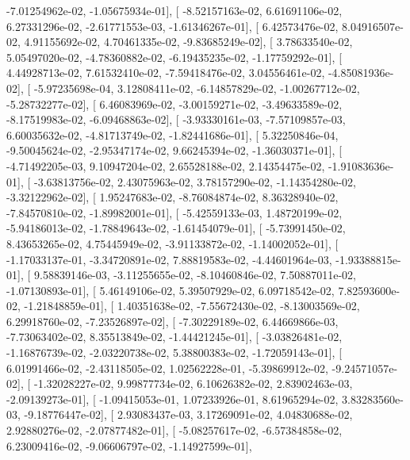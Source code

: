 \documentclass{article}
\begin{document}
         -7.01254962e-02,  -1.05675934e-01],
       [ -8.52157163e-02,   6.61691106e-02,   6.27331296e-02,
         -2.61771553e-03,  -1.61346267e-01],
       [  6.42573476e-02,   8.04916507e-02,   4.91155692e-02,
          4.70461335e-02,  -9.83685249e-02],
       [  3.78633540e-02,   5.05497020e-02,  -4.78360882e-02,
         -6.19435235e-02,  -1.17759292e-01],
       [  4.44928713e-02,   7.61532410e-02,  -7.59418476e-02,
          3.04556461e-02,  -4.85081936e-02],
       [ -5.97235698e-04,   3.12808411e-02,  -6.14857829e-02,
         -1.00267712e-02,  -5.28732277e-02],
       [  6.46083969e-02,  -3.00159271e-02,  -3.49633589e-02,
         -8.17519983e-02,  -6.09468863e-02],
       [ -3.93330161e-03,  -7.57109857e-03,   6.60035632e-02,
         -4.81713749e-02,  -1.82441686e-01],
       [  5.32250846e-04,  -9.50045624e-02,  -2.95347174e-02,
          9.66245394e-02,  -1.36030371e-01],
       [ -4.71492205e-03,   9.10947204e-02,   2.65528188e-02,
          2.14354475e-02,  -1.91083636e-01],
       [ -3.63813756e-02,   2.43075963e-02,   3.78157290e-02,
         -1.14354280e-02,  -3.32122962e-02],
       [  1.95247683e-02,  -8.76084874e-02,   8.36328940e-02,
         -7.84570810e-02,  -1.89982001e-01],
       [ -5.42559133e-03,   1.48720199e-02,  -5.94186013e-02,
         -1.78849643e-02,  -1.61454079e-01],
       [ -5.73991450e-02,   8.43653265e-02,   4.75445949e-02,
         -3.91133872e-02,  -1.14002052e-01],
       [ -1.17033137e-01,  -3.34720891e-02,   7.88819583e-02,
         -4.44601964e-03,  -1.93388815e-01],
       [  9.58839146e-03,  -3.11255655e-02,  -8.10460846e-02,
          7.50887011e-02,  -1.07130893e-01],
       [  5.46149106e-02,   5.39507929e-02,   6.09718542e-02,
          7.82593600e-02,  -1.21848859e-01],
       [  1.40351638e-02,  -7.55672430e-02,  -8.13003569e-02,
          6.29918760e-02,  -7.23526897e-02],
       [ -7.30229189e-02,   6.44669866e-03,  -7.73063402e-02,
          8.35513849e-02,  -1.44421245e-01],
       [ -3.03826481e-02,  -1.16876739e-02,  -2.03220738e-02,
          5.38800383e-02,  -1.72059143e-01],
       [  6.01991466e-02,  -2.43118505e-02,   1.02562228e-01,
         -5.39869912e-02,  -9.24571057e-02],
       [ -1.32028227e-02,   9.99877734e-02,   6.10626382e-02,
          2.83902463e-03,  -2.09139273e-01],
       [ -1.09415053e-01,   1.07233926e-01,   8.61965294e-02,
          3.83283560e-03,  -9.18776447e-02],
       [  2.93083437e-03,   3.17269091e-02,   4.04830688e-02,
          2.92880276e-02,  -2.07877482e-01],
       [ -5.08257617e-02,  -6.57384858e-02,   6.23009416e-02,
         -9.06606797e-02,  -1.14927599e-01],
\end{document}
